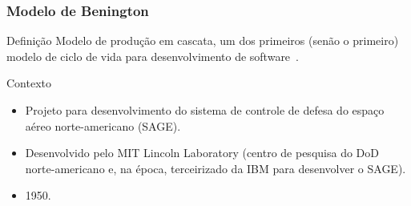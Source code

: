\begin{frame}[parent={ie:agenda}, hasnext=true, hasprev=false]
	\frametitle{Modelo de Benington}

	\begin{block:concept}{Definição}
		Modelo de produção em cascata, um dos primeiros (senão o primeiro) modelo de
		ciclo de vida para desenvolvimento de software~\cite{Benington:1983}.
	\end{block:concept}

	
	\begin{block:fact}{Contexto}
		\begin{itemize}
			\item Projeto para desenvolvimento do sistema de controle de defesa do
			espaço aéreo norte-americano (SAGE).
			
			\item Desenvolvido pelo MIT Lincoln Laboratory (centro de pesquisa do DoD
			norte-americano e, na época, terceirizado da IBM para desenvolver o SAGE).
			
			\item 1950.
		\end{itemize}
	\end{block:fact}
	
\end{frame}


